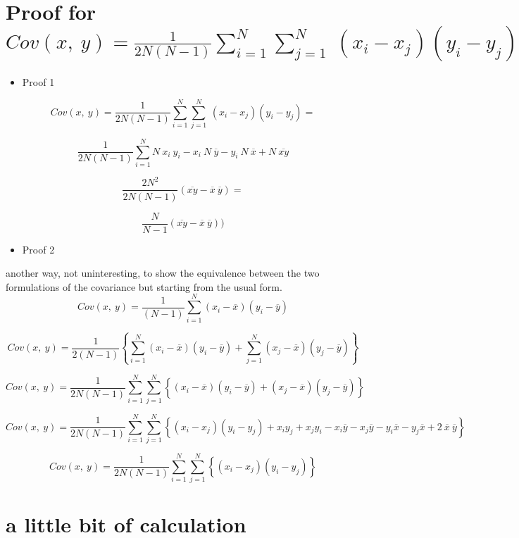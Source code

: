 \documentclass[
]{report}
\providecommand{\tightlist}{%
  \setlength{\itemsep}{0pt}\setlength{\parskip}{0pt}}
\begin{document}
\hypertarget{proof-for-covxyfrac12nn-1sum_i1n-sum_j1nx_i-x_jy_i-y_j}{%
\section{\texorpdfstring{Proof for \(Cov(x,~y)=\frac{1}{2N(N-1)}\sum_{i=1}^{N} \sum_{j=1}^{N}~(x_i-x_j)(y_i-y_j)\)}{Proof for Cov(x,\textasciitilde y)=\textbackslash frac\{1\}\{2N(N-1)\}\textbackslash sum\_\{i=1\}\^{}\{N\} \textbackslash sum\_\{j=1\}\^{}\{N\}\textasciitilde(x\_i-x\_j)(y\_i-y\_j)}}\label{proof-for-covxyfrac12nn-1sum_i1n-sum_j1nx_i-x_jy_i-y_j}}

\begin{itemize}
\tightlist
\item
  Proof 1
\end{itemize}

\[Cov(x,~y)=\frac{1}{2N(N-1)}
\sum_{i=1}^{N} \sum_{j=1}^{N}~(x_i-x_j)(y_i-y_j)
=\]

\[\frac{1}{2N(N-1)}
\sum_{i=1}^{N} N~x_i~y_i -x_i~N~\overline{y}-y_i~N~\overline{x}+N~\overline{xy}\]

\[\frac{2N^2}{2N(N-1)}(\overline{xy}-\overline{x}~\overline{y})=\]

\[\frac{N}{N-1}(\overline{xy}-\overline{x}~\overline{y}))\]

\begin{itemize}
\tightlist
\item
  Proof 2
\end{itemize}

another way, not uninteresting, to show the equivalence between the two formulations of the covariance but starting from the usual form.
\[Cov(x,~y)=\frac{1}{(N-1)}
\sum_{i=1}^{N} (x_i-\overline{x})(y_i -\overline{y})\]

\[Cov(x,~y)=\frac{1}{2(N-1)} \left\{
\sum_{i=1}^{N} (x_i-\overline{x})(y_i -\overline{y}) +
\sum_{j=1}^{N} (x_j-\overline{x})(y_j -\overline{y}) \right\}\]

\[Cov(x,~y)=\frac{1}{2N(N-1)} 
\sum_{i=1}^{N} \sum_{j=1}^{N}\left\{(x_i-\overline{x})(y_i -\overline{y}) + (x_j-\overline{x})(y_j -\overline{y}) \right\}\]

\[Cov(x,~y)=\frac{1}{2N(N-1)} 
\sum_{i=1}^{N} \sum_{j=1}^{N}\left\{(x_i-x_j)(y_i-y_j)+x_iy_j+x_jy_i-x_i\overline{y}-x_j\overline{y}-y_i\overline{x}-y_j\overline{x}+2~\overline{x}~\overline{y}\right\}\]

\[Cov(x,~y)=\frac{1}{2N(N-1)} 
\sum_{i=1}^{N} \sum_{j=1}^{N}\left\{(x_i-x_j)(y_i-y_j)\right\}\]

\hypertarget{a-little-bit-of-calculation}{%
\section{a little bit of calculation}\label{a-little-bit-of-calculation}}
\end{document}
